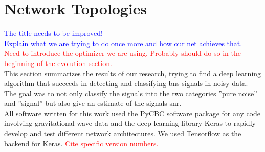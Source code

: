 \section{Network Topologies}
\textcolor{blue}{The title needs to be improved!\\Explain what we are trying to do once more and how our net achieves that.}\\
\textcolor{red}{Need to introduce the optimizer we are using. Probably should do so in the beginning of the evolution section.}\\
This section summarizes the results of our research, trying to find a deep learning algorithm that succeeds in detecting and classifying \gls{bns}-signals in noisy data. The goal was to not only classify the signals into the two categories ''pure noise'' and ''signal'' but also give an estimate of the signals \gls{snr}.\\
All software written for this work used the PyCBC software package \cite{pycbc} for any code involving gravitational wave data and the deep learning library Keras \cite{keras} to rapidly develop and test different network architectures. We used Tensorflow \cite{tensorflow} as the backend for Keras. \textcolor{red}{Cite specific version numbers.}

